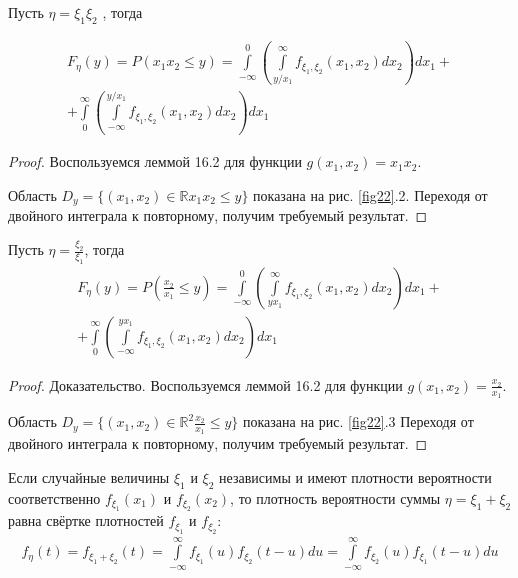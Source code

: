 \begin{lemma}
	
Пусть $\eta = \xi_1 \xi_2$ , тогда

\begin{gather*}
	F_\eta (y) = P ( x_1x_2 \leq y ) =
	\int\limits_{-\infty}^{0}\left(
		\int\limits_{y/x_1}^{\infty} f_{\xi_1,\xi_2} (x_1, x_2 ) dx_2
	\right)dx_1+\\+
	\int\limits_{0}^{\infty}\left(
		\int\limits^{y/x_1}_{-\infty} f_{\xi_1,\xi_2} (x_1, x_2 ) dx_2
	\right)dx_1
\end{gather*}
\end{lemma}

\begin{proof}
	Воспользуемся леммой 16.2 для функции $g(x_1 , x_2 ) = x_1 x_2$.

Область $D_y = \{(x_1 , x_2 ) \in \mathbb{\mathbb{R}} x_1 x_2 \leq y\}$ показана на рис. \ref{fig22}.2. Переходя от двойного интеграла к повторному, получим требуемый результат.
\end{proof}

\begin{lemma}
Пусть $\eta = \frac{\xi_2}{\xi_1}$, тогда
\begin{gather*}
	F_\eta (y) = P ( \frac{x_2}{x_1} \leq y ) =
	\int\limits_{-\infty}^{0}\left(
		\int\limits_{yx_1}^{\infty} f_{\xi_1,\xi_2} (x_1, x_2 ) dx_2
	\right)dx_1+\\+
	\int\limits_{0}^{\infty}\left(
		\int\limits^{yx_1}_{-\infty} f_{\xi_1,\xi_2} (x_1, x_2 ) dx_2
	\right)dx_1
\end{gather*}
\end{lemma}
\begin{proof}
Доказательство. Воспользуемся леммой 16.2 для функции $g(x_1 , x_2 ) = \frac{x_2}{x_1}$.

Область $D_y = \{(x_1 , x_2 ) \in \mathbb{R}^2  \frac{x_2}{x_1} \leq y\}$ показана на рис. \ref{fig22}.3 Переходя от двойного интеграла к повторному, получим требуемый результат.
\end{proof}

\begin{lemma}[О свёртке]
	Если случайные величины $\xi_1$ и $\xi_2$ независимы
и имеют плотности вероятности соответственно $f_{\xi_1} (x_1 )$ и $f_{\xi_2} (x_2 )$, то плотность вероятности суммы $\eta = \xi_1 + \xi_2$ равна свёртке плотностей $f_{\xi_1}$ и $f_{\xi_2}$:
\begin{gather*}
	f_\eta (t)=f_{\xi_1+\xi_2}(t)=\int\limits_{-\infty}^{\infty} f_{\xi_1} (u)f_{\xi_2} (t - u) du=
	\int\limits_{-\infty}^{\infty} f_{\xi_2}(u)f_{\xi_1} (t - u) du
\end{gather*}
\end{lemma}

